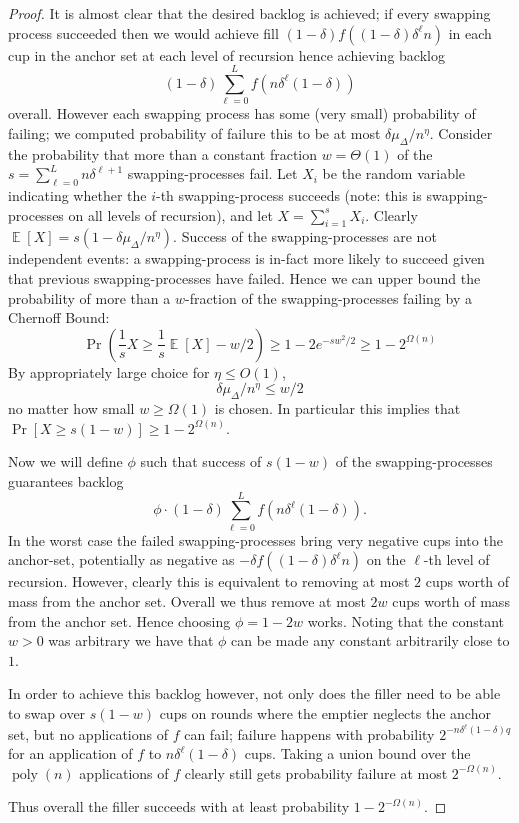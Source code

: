 \documentclass[twocolumn]{article}[10pt]
\DeclareMathOperator{\E}{\mathbb{E}}
\DeclareMathOperator{\poly}{\text{poly}}
\begin{document}
\begin{proof}
  It is almost clear that the desired backlog is achieved; if every swapping
  process succeeded then we would achieve fill $(1-\delta)
  f((1-\delta)\delta^\ell n)$ in each cup in the anchor set at each level of
  recursion hence achieving backlog $$(1-\delta)\sum_{\ell=0}^L
  f(n\delta^\ell(1-\delta))$$ overall. However each swapping process has some
  (very small) probability of failing; we computed probability of failure this
  to be at most $\delta \mu_\Delta / n^\eta.$ Consider the probability that
  more than a constant fraction $w = \Theta(1)$ of the $s = \sum_{\ell=0}^L
  n\delta^{\ell+1}$ swapping-processes fail. Let $X_i$ be the random variable
  indicating whether the $i$-th swapping-process succeeds (note: this is
  swapping-processes on all levels of recursion), and let $X=\sum_{i=1}^s X_i$.
  Clearly $\E[X] = s(1-\delta\mu_\Delta/n^\eta)$. Success of the
  swapping-processes are not independent events: a swapping-process is in-fact
  more likely to succeed given that previous swapping-processes have failed.
  Hence we can upper bound the probability of more than a $w$-fraction of the
  swapping-processes failing by a Chernoff Bound: $$\Pr\left(\frac{1}{s}X \ge
  \frac{1}{s}\E[X] - w/2\right) \ge 1-2e^{-s w^2/2} \ge 1-2^{\Omega(n)}$$ By
  appropriately large choice for $\eta \le O(1)$, $$\delta\mu_\Delta /n^\eta
  \le w/2$$ no matter how small $w \ge \Omega(1)$ is chosen. In particular this
  implies that $\Pr[X \ge s(1-w)] \ge 1-2^{\Omega(n)}$.

  Now we will define $\phi$ such that success of $s(1-w)$ of the
  swapping-processes guarantees backlog $$\phi \cdot (1-\delta) \sum_{\ell=0}^L
  f(n\delta^\ell(1-\delta)).$$ In the worst case the failed swapping-processes
  bring very negative cups into the anchor-set, potentially as negative as
  $-\delta f((1-\delta)\delta^\ell n)$ on the $\ell$-th level of recursion.
  However, clearly this is equivalent to removing at most $2$ cups worth of
  mass from the anchor set. Overall we thus remove at most $2w$ cups worth of
  mass from the anchor set. Hence choosing $\phi = 1-2w$ works.
  Noting that the constant $w > 0$ was arbitrary we have that $\phi$ can be
  made any constant arbitrarily close to $1$.

  In order to achieve this backlog however, not only does the filler need to be
  able to swap over $s(1-w)$ cups on rounds where the emptier neglects the
  anchor set, but no applications of $f$ can fail; failure happens with
  probability $2^{-n\delta^\ell(1-\delta) q}$ for an application of $f$ to
  $n\delta^\ell(1-\delta)$ cups. Taking a union bound over the $\poly(n)$
  applications of $f$ clearly still gets probability failure at most
  $2^{-\Omega(n)}$.

  Thus overall the filler succeeds with at least probability $1-2^{-\Omega(n)}$.

\end{proof}
\end{document}
